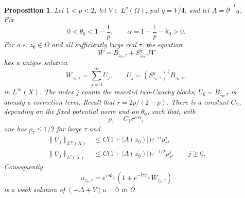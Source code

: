 \documentclass[a4paper,11pt]{article}
\theoremstyle{plain}
\newtheorem{prop}[thm]{Proposition}
\theoremstyle{definition}
\theoremstyle{remark}
\begin{document}
\begin{prop}\label{prop-cgo-precise}
Let $1<p<2$, let $V\in L^p(\Omega)$, put $q=V/4$, and let $A=\bar\partial^{-1}q$.  Fix
\begin{equation}\label{alpha-def-general}
        0<\theta_0<1-\frac1p,
        \qquad
        \alpha=1-\frac1p-\theta_0>0.
\end{equation}
For a.e. $z_0\in\Omega$ and all sufficiently large real $\tau$, the equation
\begin{equation}
        W=B_{z_0,\tau}+S^q_{z_0,\tau}W
\end{equation}
has a unique solution
\begin{equation}\label{W-neumann-series}
        W_{z_0,\tau}=\sum_{j=0}^\infty U_j,
        \qquad
        U_j=(S^q_{z_0,\tau})^jB_{z_0,\tau},
\end{equation}
in $L^\infty(X)$. The index $j$ counts the inserted two-Cauchy blocks; $U_0=B_{z_0,\tau}$ is already a correction term. Recall that $r=2p/(2-p)$. There is a constant $C_V$, depending on the fixed potential norm and on $\theta_0$, such that, with
\begin{equation}\label{rho-tau-def}
        \rho_\tau=C_V\tau^{-\alpha},
\end{equation}
one has $\rho_\tau\leq1/2$ for large $\tau$ and
\begin{align}
        \|U_j\|_{L^\infty(X)}
        &\leq C\bigl(1+|A(z_0)|\bigr)\tau^{-\alpha}\rho_\tau^j,
        \label{Uj-Linf-general}\\
        \|U_j\|_{L^r(X)}
        &\leq C\bigl(1+|A(z_0)|\bigr)\tau^{-1/2}\rho_\tau^j,
        \qquad j\geq0 .
        \label{Uj-Lr-general}
\end{align}
Consequently
\begin{equation}
        u_{z_0,\tau}=e^{i\tau\Phi_{z_0}}
        \left(1+e^{-i\tau\psi_{z_0}}W_{z_0,\tau}\right)
\end{equation}
is a weak solution of $(-\Delta+V)u=0$ in $\Omega$.
\end{prop}
\end{document}
